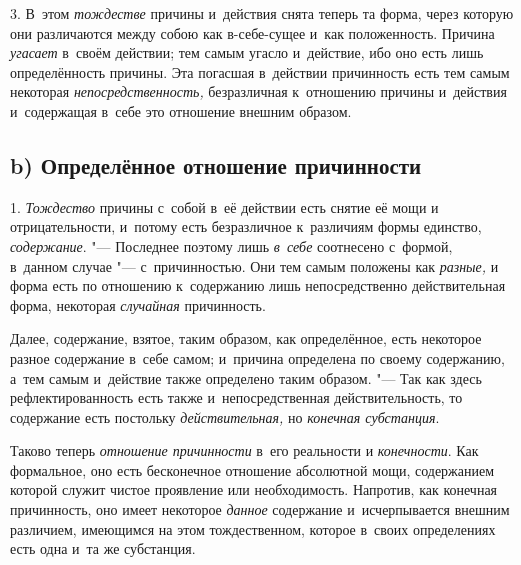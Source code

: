 3. В~этом {\em тождестве} причины и~действия снята теперь та форма, через
которую они различаются между собою как в-себе-сущее и~как положенность.
Причина {\em угасает} в~своём действии; тем самым угасло и~действие, ибо оно
есть лишь определённость причины. Эта погасшая в~действии причинность есть тем
самым некоторая {\em непосредственность,} безразличная к~отношению причины
и~действия и~содержащая в~себе это отношение внешним образом.

\subsection%
[b) Определённое отношение причинности]%
{b) Определённое отношение причинности}

1. {\em Тождество} причины с~собой в~её действии есть снятие её мощи и
отрицательности, и~потому есть безразличное к~различиям формы единство,
{\em содержание}. "--- Последнее поэтому лишь {\em в~себе} соотнесено с~формой,
в~данном случае "--- с~причинностью. Они тем самым положены как {\em разные,} и
форма есть по отношению к~содержанию лишь непосредственно действительная форма,
некоторая {\em случайная} причинность.

Далее, содержание, взятое, таким образом, как определённое, есть некоторое
разное содержание в~себе самом; и~причина определена по своему содержанию,
а~тем самым и~действие также определено таким образом. "--- Так как здесь
рефлектированность есть также и~непосредственная действительность, то
содержание есть постольку {\em действительная,} но {\em конечная субстанция}.

Таково теперь {\em отношение причинности} в~его реальности и {\em конечности}.
Как формальное, оно есть бесконечное отношение абсолютной мощи, содержанием
которой служит чистое проявление или необходимость. Напротив, как конечная
причинность, оно имеет некоторое {\em данное} содержание и~исчерпывается
внешним различием, имеющимся на этом тождественном, которое в~своих
определениях есть одна и~та же субстанция.

